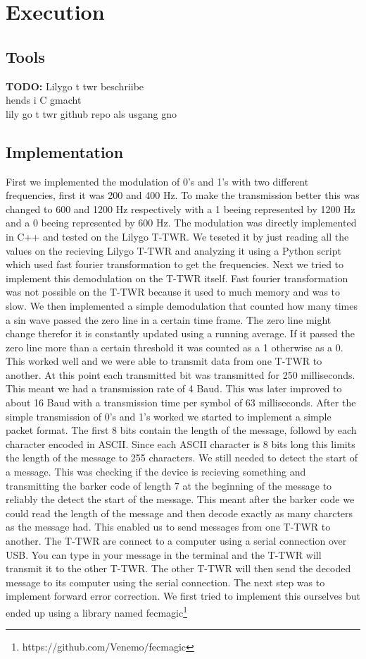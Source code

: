 \chapter{Execution}
\section{Tools}
\textbf{TODO: } Lilygo t twr beschriibe \\
hends i C gmacht \\
lily go t twr github repo als usgang gno 

\section{Implementation}

First we implemented the modulation of 0's and 1's with two different frequencies, first it was 200 and 400 Hz. To make the transmission better this was changed to 600 and 1200 Hz respectively with a 1 beeing represented by 1200 Hz and a 0 beeing represented by 600 Hz. The modulation was directly implemented in C++ and tested on the Lilygo T-TWR. We teseted it by just reading all the values on the recieving Lilygo T-TWR and analyzing it using a Python script which used fast fourier transformation to get the frequencies. Next we tried to implement this demodulation on the T-TWR itself. Fast fourier transformation was not possible on the T-TWR because it used to much memory and was to slow. We then implemented a simple demodulation that counted how many times a sin wave passed the zero line in a certain time frame. The zero line might change therefor it is constantly updated using a running average. If it passed the zero line more than a certain threshold it was counted as a 1 otherwise as a 0. This worked well and we were able to transmit data from one T-TWR to another. At this point each transmitted bit was transmitted for 250 milliseconds. This meant we had a transmission rate of 4 Baud. This was later improved to about 16 Baud with a transmission time per symbol of 63 milliseconds. After the simple transmission of 0's and 1's worked we started to implement a simple packet format. The first 8 bits contain the length of the message, followd by each character encoded in ASCII. Since each ASCII character is 8 bits long this limits the length of the message to 255 characters. We still needed to detect the start of a message. This was checking if the device is recieving something and transmitting the barker code of length 7 at the beginning of the message to reliably the detect the start of the message. This meant after the barker code we could read the length of the message and then decode exactly as many charcters as the message had. This enabled us to send messages from one T-TWR to another. The T-TWR are connect to a computer using a serial connection over USB. You can type in your message in the terminal and the T-TWR will transmit it to the other T-TWR. The other T-TWR will then send the decoded message to its computer using the serial connection. The next step was to implement forward error correction. We first tried to implement this ourselves but ended up using a library named fecmagic\footnote{https://github.com/Venemo/fecmagic} 